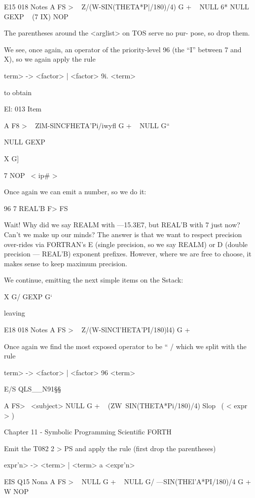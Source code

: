 

E15 018 Notes
A FS > \ < subject >
Z/(W-SIN(THETA*P|/180)/4) G + \ < term >
NULL 6*
NULL GEXP \ < function >
(7 IX) NOP \ < arglist >

The parentheses around the <arglist> on TOS serve no pur-
pose, so drop them.

We see, once again, an operator of the priority-level 96 (the “I”
between 7 and X), so we again apply the rule

\<term> -> <factor> | <factor> 9i. <term>

to obtain

El: 013 Item

A F8 > \ < subject >
ZlM-SlNCFHETA'Pi/iwyﬂ G + \ < term >
NULL G“

NULL GEXP

X G] \ < id >

7 NOP \ < ip# >

Once again we can emit a number, so we do it:

96 7 REAL'B F> FS

Wait! Why did we say REALM with —15.3E7, but REAL'B with
7 just now? Can’t we make up our minds? The answer is that we
want to respect precision over-rides via FORTRAN's E (single
precision, so we say REALM) or D (double precision — REAL'B)
exponent prefixes. However, where we are free to choose, it
makes sense to keep maximum precision.

We continue, emitting the next simple items on the Sstack:

X G/ GEXP G‘

 

leaving

E18 018 Notes
A FS > \ < subject >
Z/(W-SlNCI’HETA'PI/180)l4) G + \ < term >

Once again we find the most exposed operator to be “ / which
we split with the rule

\<term> -> <factor> | <factor> 96 <term>

 

E/S QLS__N91§§

A FS> \ <subject>
NULL G + \ < term >
(ZW~SIN(THETA*Pi/180)/4) Slop \ ( < expr > )

Chapter 11 - Symbolic Programming Scientific FORTH

Emit the T082
2 > PS
and apply the rule (first drop the parentheses)

\<expr'n> -> <term> | <term> a <expr'n>

 

EIS Q15 Nona
A FS > \ < subject >
NULL G + \ < term >
NULL G/
—SIN(THEl'A*PI/180)/4 G +
W NOP

